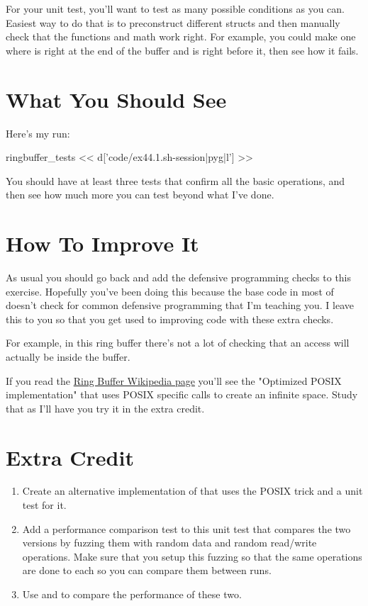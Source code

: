 For your unit test, you'll want to test as many possible conditions
as you can.  Easiest way to do that is to preconstruct different 
structs and then manually check that the functions and math work
right.  For example, you could make one where  is right at the
end of the buffer and  is right before it, then see how
it fails.


\section{What You Should See}

Here's my  run:

\begin{code}{ringbuffer\_tests}
<< d['code/ex44.1.sh-session|pyg|l'] >>
\end{code}

You should have at least three tests that confirm all the basic operations,
and then see how much more you can test beyond what I've done.

\section{How To Improve It}

As usual you should go back and add the defensive programming checks
to this exercise.  Hopefully you've been doing this because the base
code in most of  doesn't check for common defensive
programming that I'm teaching you.  I leave this to you so that you get
used to improving code with these extra checks.

For example, in this ring buffer there's not a lot of checking that an
access will actually be inside the buffer.

If you read the \href{http://en.wikipedia.org/wiki/Ring_buffer}{Ring Buffer
Wikipedia page} you'll see the "Optimized POSIX implementation" that uses POSIX
specific calls to create an infinite space.  Study that as I'll have you 
try it in the extra credit.


\section{Extra Credit}

\begin{enumerate}
\item Create an alternative implementation of  that uses
    the POSIX trick and a unit test for it.
\item Add a performance comparison test to this unit test that compares the
    two versions by fuzzing them with random data and random read/write operations.
    Make sure that you setup this fuzzing so that the same operations are done
    to each so you can compare them between runs.
\item Use  and  to compare the 
    performance of these two.
\end{enumerate}

